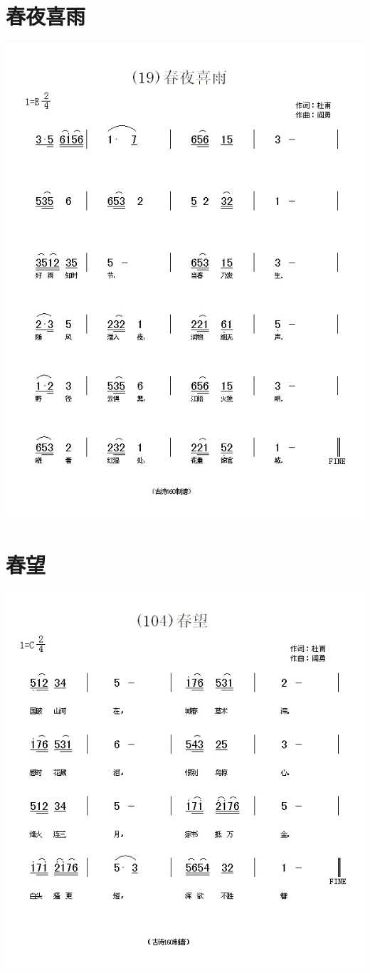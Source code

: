 \documentclass[cn,pad,twocol]{elegantbook}
\begin{document}
\section{春夜喜雨}
    \includegraphics[width=\textwidth]{dongxiao/20200808-春夜喜雨-杜甫.jpg}
\section{春望}
    \includegraphics[width=\textwidth]{dongxiao/20200808-春望-杜甫.jpg}
\end{document}
